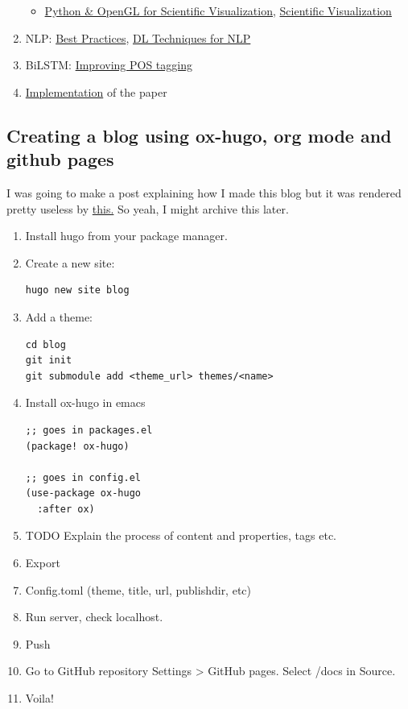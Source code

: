 \documentclass[11pt]{article}
\begin{document}
\begin{enumerate}
\begin{itemize}
\item \href{https://www.labri.fr/perso/nrougier/python-opengl/}{Python \& OpenGL for Scientific Visualization}, \href{https://github.com/rougier/scientific-visualization-book}{Scientific Visualization}
\end{itemize}
\item NLP: \href{https://github.com/microsoft/nlp-recipes}{Best Practices}, \href{https://nlpoverview.com/}{DL Techniques for NLP}
\item BiLSTM: \href{https://arxiv.org/pdf/1807.00818v1.pdf}{Improving POS tagging}
\item \href{https://github.com/google/meta\_tagger}{Implementation} of the paper
\end{enumerate}
\subsection{Creating a blog using ox-hugo, org mode and github pages}
\label{sec:org28d1a31}
I was going to make a post explaining how I made this blog but it was rendered pretty useless by \href{https://dev.to/usamasubhani/setup-a-blog-with-hugo-and-github-pages-562n}{this.} So yeah, I might archive this later.

\begin{enumerate}
\item Install hugo from your package manager.
\item Create a new site:
\begin{verbatim}
hugo new site blog
\end{verbatim}
\item Add a theme:
\begin{verbatim}
cd blog
git init
git submodule add <theme_url> themes/<name>
\end{verbatim}
\item Install ox-hugo in emacs
\begin{verbatim}
;; goes in packages.el
(package! ox-hugo)

;; goes in config.el
(use-package ox-hugo
  :after ox)
\end{verbatim}
\item TODO Explain the process of content and properties, tags etc.
\item Export
\item Config.toml (theme, title, url, publishdir, etc)
\item Run server, check localhost.
\item Push
\item Go to GitHub repository Settings > GitHub pages. Select /docs in Source.
\item Voila!
\end{enumerate}
\end{document}
